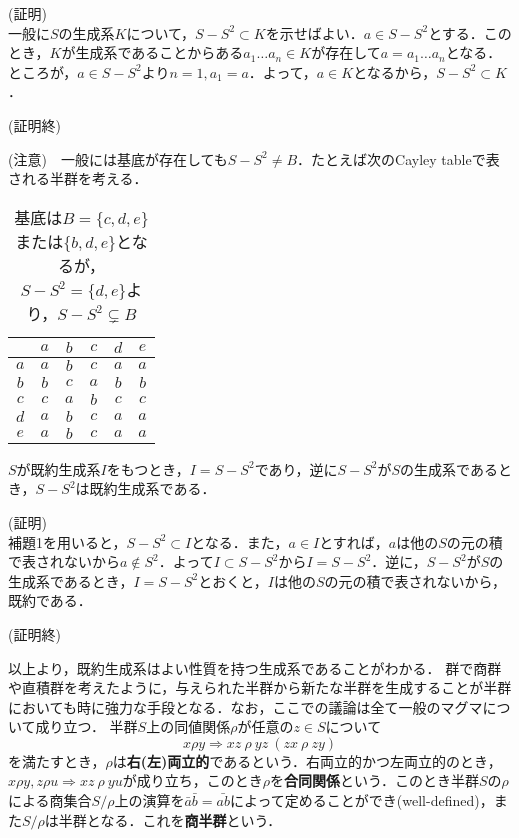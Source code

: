 (証明) \\
一般に$S$の生成系$K$について，$S-S^2\subset K$を示せばよい．$a\in S-S^2$とする．このとき，$K$が生成系であることからある$a_1\dots a_n\in K$が存在して$a=a_1\dots a_n$となる．ところが，$a\in S-S^2$より$n=1, a_1=a$．よって，$a\in K$となるから，$S-S^2\subset K$．
\begin{flushright}
(証明終)
\end{flushright}
(注意)　一般には基底が存在しても$S-S^2\neq B$．たとえば次のCayley tableで表される半群を考える．
\begin{table}[htb]
\begin{center}
\begin{tabular}{c|ccccc}
     &$a$&$b$&$c$&$d$&$e$ \\ \hline
$a$&$a$&$b$&$c$&$a$&$a$ \\
$b$&$b$&$c$&$a$&$b$&$b$ \\
$c$&$c$&$a$&$b$&$c$&$c$ \\
$d$&$a$&$b$&$c$&$a$&$a$ \\
$e$&$a$&$b$&$c$&$a$&$a$
\end{tabular}
\caption{基底は$B=\{c,d,e\}$または$\{b,d,e\}$となるが，$S-S^2=\{d,e\}$より，$S-S^2\subsetneq B$}
\end{center}
\end{table}
\begin{sthm}
$S$が既約生成系$I$をもつとき，$I=S-S^2$であり，逆に$S-S^2$が$S$の生成系であるとき，$S-S^2$は既約生成系である．
\end{sthm}
(証明)　\\
補題1を用いると，$S-S^2\subset I$となる．また，$a\in I$とすれば，$a$は他の$S$の元の積で表されないから$a\notin S^2$．よって$I\subset S-S^2$から$I=S-S^2$．逆に，$S-S^2$が$S$の生成系であるとき，$I=S-S^2$とおくと，$I$は他の$S$の元の積で表されないから，既約である．
\begin{flushright}
(証明終)
\end{flushright}
以上より，既約生成系はよい性質を持つ生成系であることがわかる．
群で商群や直積群を考えたように，与えられた半群から新たな半群を生成することが半群においても時に強力な手段となる．なお，ここでの議論は全て一般のマグマについて成り立つ．
半群$S$上の同値関係$\rho$が任意の$z\in S$について$$x\rho y\Rightarrow  xz\:\rho\: yz\:(zx\:\rho\: zy)$$を満たすとき，$\rho$は{\bf 右(左)両立的}であるという．右両立的かつ左両立的のとき，$x\rho y, z\rho u\Rightarrow xz\:\rho\:yu$が成り立ち，このとき$\rho$を{\bf 合同関係}という．このとき半群$S$の$\rho$による商集合$S/\rho$上の演算を$\bar{a}\bar{b}=\bar{ab}$によって定めることができ(well-defined)，また$S/\rho$は半群となる．これを{\bf 商半群}という．\\
